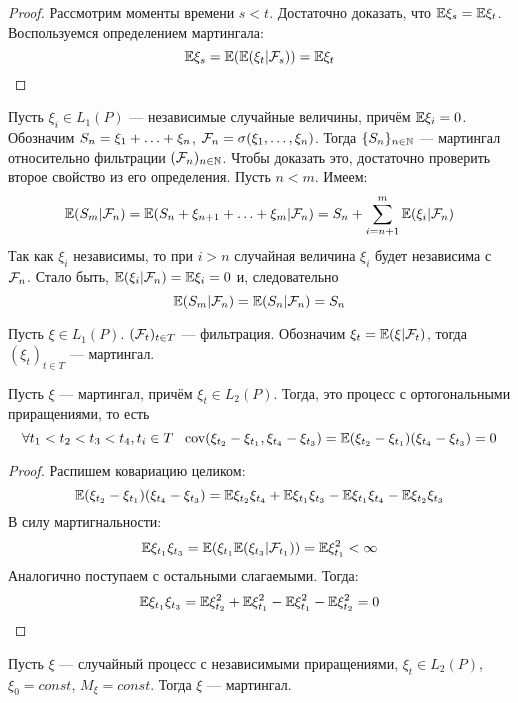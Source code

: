 \begin{proof}
	Рассмотрим моменты времени $s < t$. Достаточно доказать, что $\mathbb{E}\xi_s = \mathbb{E}\xi_t$. Воспользуемся определением мартингала:
	\[
		\mathbb{E}\xi_s = \mathbb{E}(\mathbb{E}(\xi_t | \mathcal{F}_s)) = \mathbb{E}\xi_t
	\]
\end{proof}

\begin{example}
	Пусть $\xi_i \in L_1(P)$ --- независимые случайные величины, причём $\mathbb{E}\xi_i = 0$. Обозначим $S_n = \xi_1 + \ldots + \xi_n$, $\mathcal{F}_n = \sigma(\xi_1, \ldots, \xi_n)$. Тогда $\{S_n\}_{n \in \mathbb{N}}$ --- мартингал относительно фильтрации $(\mathcal{F}_n)_{n \in \mathbb{N}}$. Чтобы доказать это, достаточно проверить второе свойство из его определения. Пусть $n < m$. Имеем:
	\[
		\mathbb{E}(S_m | \mathcal{F}_n) = \mathbb{E}(S_n + \xi_{n + 1} + \ldots + \xi_m | \mathcal{F}_n) = S_n + \sum_{i = n + 1}^m \mathbb{E}(\xi_i | \mathcal{F}_n)
	\]
	Так как $\xi_i$ независимы, то при $i > n$ случайная величина $\xi_i$ будет независима с $\mathcal{F}_n$. Стало быть, $\mathbb{E}(\xi_i | \mathcal{F}_n) = \mathbb{E}\xi_i = 0$ и, следовательно
	\[
		\mathbb{E}(S_m | \mathcal{F}_n) = \mathbb{E}(S_n | \mathcal{F}_n) = S_n
	\]
\end{example}

\begin{example}
	Пусть $\xi \in L_1(P)$. $(\mathcal{F}_t)_{t \in T}$ --- фильтрация. Обозначим $\xi_t = \mathbb{E}(\xi | \mathcal{F}_t)$, тогда $(\xi_t)_{t \in T}$ --- мартингал.
\end{example}

\begin{proposition}
	Пусть $\xi$ --- мартингал, причём $\xi_t \in L_2(P)$. Тогда, это процесс с ортогональными приращениями, то есть
	\[
		\forall t_1 < t_2 < t_3 < t_4, t_i \in T\ \ \operatorname{cov}(\xi_{t_2} - \xi_{t_1}, \xi_{t_4} - \xi_{t_3}) = \mathbb{E}(\xi_{t_2} - \xi_{t_1})(\xi_{t_4} - \xi_{t_3}) = 0
	\]
\end{proposition}

\begin{proof}
	Распишем ковариацию целиком:
	\[
		\mathbb{E}(\xi_{t_2} - \xi_{t_1})(\xi_{t_4} - \xi_{t_3}) = \mathbb{E}\xi_{t_2}\xi_{t_4} + \mathbb{E}\xi_{t_1}\xi_{t_3} - \mathbb{E}\xi_{t_1}\xi_{t_4} - \mathbb{E}\xi_{t_2}\xi_{t_3}
	\]
	В силу мартигнальности:
	\[
		\mathbb{E}\xi_{t_1}\xi_{t_3} = \mathbb{E}(\xi_{t_1}\mathbb{E}(\xi_{t_3} | \mathcal{F}_{t_1})) = \mathbb{E}\xi_{t_1}^2 < \infty
	\]
	Аналогично поступаем с остальными слагаемыми. Тогда:
	\[
		\mathbb{E}\xi_{t_1}\xi_{t_3} = \mathbb{E}\xi_{t_2}^2 + \mathbb{E}\xi_{t_1}^2 - \mathbb{E}\xi_{t_1}^2 - \mathbb{E}\xi_{t_2}^2 = 0
	\]
\end{proof}

\begin{theorem}
	Пусть $\xi$ --- случайный процесс с независимыми приращениями, $\xi_t \in L_2(P)$, $\xi_0 = const$, $M_\xi = const$. Тогда $\xi$ --- мартингал.
\end{theorem}

